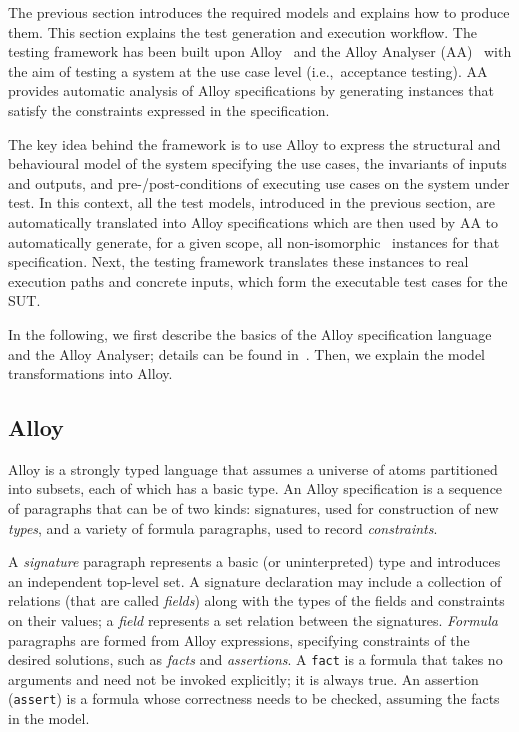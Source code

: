 %
%
\label{sec:test-generation-execution}
The previous section introduces the required models and explains how to produce them. This section explains the test generation and execution workflow. The testing framework has been built upon Alloy~\cite{Jackson2002} and the Alloy Analyser (AA)~\cite{Jackson2000} with the aim of testing a system at the use case level (i.e.,\ acceptance testing). AA provides automatic analysis of Alloy specifications by generating instances that satisfy the constraints expressed in the specification.

The key idea behind the framework is to use Alloy to express the structural and behavioural model of the system specifying the use cases, the invariants of inputs and outputs, and pre-/post-conditions of executing use cases on the system under test. In this context, all the test models, introduced in the previous section, are automatically translated into Alloy specifications which are then used by AA to automatically generate, for a given scope, all non-isomorphic~\cite{Shlyakhter2007} instances for that specification. Next, the testing framework translates these instances to real execution paths and concrete inputs, which form the executable test cases for the SUT.

In the following, we first describe the basics of the Alloy specification language and the Alloy Analyser; details can be found in~\cite{Jackson2000,Jackson2002,Jackson2012}. Then, we explain the model transformations into Alloy.

\subsection{Alloy}
\label{sec:test-generation-execution-alloy}
Alloy is a strongly typed language that assumes a universe of atoms partitioned into subsets, each of which has a basic type. An Alloy specification is a sequence of paragraphs that can be of two kinds: signatures, used for construction of new \textit{types}, and a variety of formula paragraphs, used to record \textit{constraints}. 

A \textit{signature} paragraph represents a basic (or uninterpreted) type and introduces an independent top-level set. A signature declaration may include a collection of relations (that are called \textit{fields}) along with the types of the fields and constraints on their values; a \textit{field} represents a set relation between the signatures. \textit{Formula} paragraphs are formed from Alloy expressions, specifying constraints of the desired solutions, such as \textit{facts} and \textit{assertions}. A \texttt{fact} is a formula that takes no arguments and need not be invoked explicitly; it is always true. An assertion (\texttt{assert}) is a formula whose correctness needs to be checked, assuming the facts in the model. 

